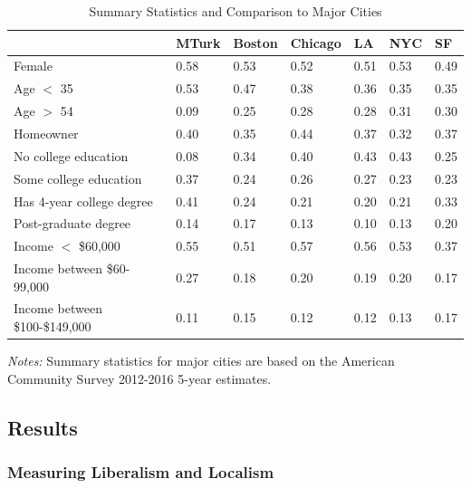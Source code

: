 \documentclass[article,12pt]{memoir}
\begin{document}
\begin{table}
  \begin{threeparttable}
  \caption{Summary Statistics and Comparison to Major Cities}
  \label{tab:hg_e_summary_stats}
  \footnotesize
  \begin{tabularx}{\textwidth}{lXXXXXX}
    \hline
     & MTurk & Boston & Chicago & LA & NYC & SF \\ \hline
  Female & 0.58 & 0.53 & 0.52 & 0.51 & 0.53 & 0.49 \\ 
    Age $<$ 35 & 0.53 & 0.47 & 0.38 & 0.36 & 0.35 & 0.35 \\ 
    Age $>$ 54 & 0.09 & 0.25 & 0.28 & 0.28 & 0.31 & 0.30 \\ 
    Homeowner & 0.40 & 0.35 & 0.44 & 0.37 & 0.32 & 0.37 \\ 
    No college education & 0.08 & 0.34 & 0.40 & 0.43 & 0.43 & 0.25 \\ 
    Some college education & 0.37 & 0.24 & 0.26 & 0.27 & 0.23 & 0.23 \\ 
    Has 4-year college degree & 0.41 & 0.24 & 0.21 & 0.20 & 0.21 & 0.33 \\ 
    Post-graduate degree & 0.14 & 0.17 & 0.13 & 0.10 & 0.13 & 0.20 \\ 
    Income $<$ \$60,000 & 0.55 & 0.51 & 0.57 & 0.56 & 0.53 & 0.37 \\ 
    Income between \$60-99,000 & 0.27 & 0.18 & 0.20 & 0.19 & 0.20 & 0.17 \\ 
    Income between \$100-\$149,000 & 0.11 & 0.15 & 0.12 & 0.12 & 0.13 & 0.17 \\ 
     \hline
  \end{tabularx}
  \begin{tablenotes}[flushleft]
    \item \hspace{-.2em}\emph{Notes:} Summary statistics for major cities are based on the American Community Survey 2012-2016 5-year estimates.
  \end{tablenotes}
  \end{threeparttable}
\end{table}

\subsection{Results}

\subsubsection{Measuring Liberalism and Localism} 
\end{document}
